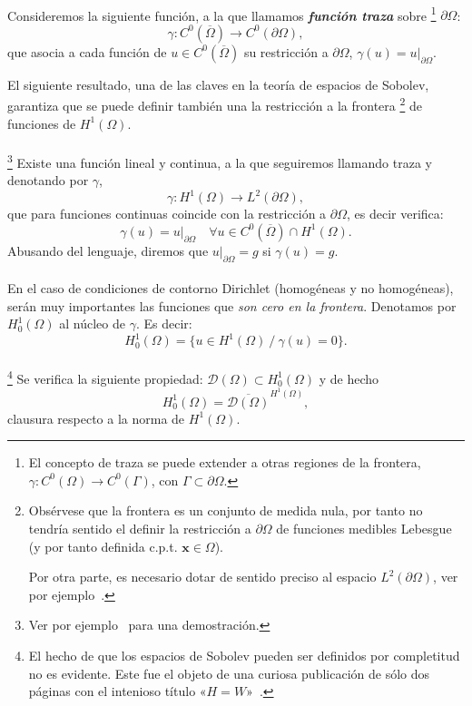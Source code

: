 \documentclass[11pt]{article}
\theoremstyle{plain}
\theoremstyle{definition}
\newcounter{stepnum}[section]
\newcommand{\step}[1][]{\bigskip\noindent\textbf{\thesection.\refstepcounter{stepnum}\thestepnum}.\enspace{#1}}
\renewcommand{\step}[1][]{\paragraph{#1}\hspace{-1.1em}}
\newcommand{\deff}[1]{\textit{\textbf{#1}}}
\newcommand{\xx}{\ensuremath{\mathbf{x}}\xspace}
\newcommand{\TestSpace}{\ensuremath{\mathcal{D}}}
\begin{document}
\step 
Consideremos la siguiente función, a la que llamamos \deff{función traza} sobre%
\footnote{El concepto de traza se puede extender a otras regiones de la frontera, $\gamma:C^0(\Omega) \to C^0(\Gamma)$, con $\Gamma\subset\partial\Omega$.}
%
$\partial\Omega$:
\[
  \gamma:C^0(\overline\Omega) \to C^0(\partial\Omega),
\]
que asocia a cada función de $u\in C^0(\overline\Omega)$ su restricción a $\partial\Omega$, $\gamma(u)=u|_{\partial\Omega}$.

El siguiente resultado, una de las claves en la teoría de espacios de Sobolev, garantiza que se puede definir también una la restricción a la frontera%
%
\footnote{Obsérvese que la frontera es un conjunto de medida nula, por tanto no tendría sentido el definir la restricción a $\partial\Omega$ de funciones medibles Lebesgue (y por tanto definida c.p.t. $\xx\in\Omega$).\par 
Por otra parte, es necesario dotar de sentido preciso al espacio $L^2(\partial\Omega)$, ver por ejemplo~\cite{sayas2019variational}.}
de funciones de $H^1(\Omega)$. 

\step{\textbf{Teorema.}}\footnote{Ver por ejemplo~\cite{sayas2019variational} para una demostración.} 
Existe una función lineal y continua, a la que seguiremos llamando traza y denotando por $\gamma$,
\[
  \gamma:  H^1(\Omega) \to L^2(\partial\Omega),
\]
que para funciones continuas coincide con la restricción a $\partial\Omega$, es decir verifica:
\[
  \gamma(u) = u|_{\partial\Omega} \quad  \forall u\in C^0(\overline\Omega)\cap H^1(\Omega).
\]
Abusando del lenguaje, diremos que $u|_{\partial\Omega}=g$ si $\gamma(u)=g$.

\step
En el caso de condiciones de contorno Dirichlet (homogéneas y no homogéneas), serán muy importantes las funciones que \textit{son cero en la frontera}. Denotamos por $H_0^1(\Omega)$ al núcleo de $\gamma$. Es decir:
\[
  H_0^1(\Omega) = \{ u\in H^1(\Omega) \ /\ \gamma(u)=0\}.
\]

\step{\textbf{Teorema.}}%
\footnote{El hecho de que los espacios de Sobolev pueden ser definidos por completitud no es evidente. Este fue el objeto de una curiosa publicación de sólo dos páginas con el intenioso título «$H=W$»~\cite{meyers1964h}.}
Se verifica la siguiente propiedad: $\TestSpace(\Omega)\subset H_0^1(\Omega)$ y de hecho%
$$H_0^1(\Omega) = \overline{\TestSpace(\Omega)}^{H^1(\Omega)},$$ clausura respecto a la norma de $H^1(\Omega)$.
\end{document}
